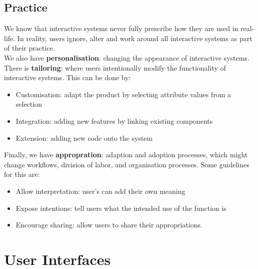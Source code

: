 \documentclass{article}
\begin{document}
\subsection{Practice}
We know that interactive systems never fully prescribe how they are used in real-life. In reality, users ignore, alter and work around all interactive systems as part of their practice. \\
We also have \textbf{personalisation}: changing the appearance of interactive systems. \\
There is \textbf{tailoring}: where users intentionally modify the functionality of interactive systems. This can be done by:
\begin{itemize}
    \item Customisation: adapt the product by selecting attribute values from a selection
    \item Integration: adding new features by linking existing components
    \item Extension: adding new code onto the system
\end{itemize}
Finally, we have \textbf{appropration}: adaption and adoption processes, which might change workflows, division of labor, and organisation processes. Some guidelines for this are:
\begin{itemize}
    \item Allow interpretation: user's can add their own meaning
    \item Expose intentions: tell users what the intended use of the function is
    \item Encourage sharing: allow users to share their appropriations.
\end{itemize}
\section{User Interfaces}
\end{document}
